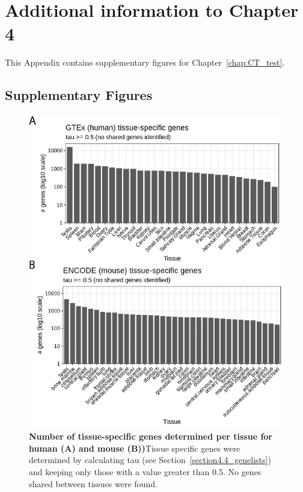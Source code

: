
\chapter{Additional information to Chapter 4} \label{appendix:CTsub}
This Appendix contains supplementary figures for Chapter~\ref{chap:CT_test}.


\section{Supplementary Figures}
\label{sectionC1.1}

\begin{figure}[pt!] 
\centering    
\includegraphics[width=1.0\textwidth]{Appendix3/Figs/appB_uniqueGenesTissue.png} %
\caption[Number of tissue-specific genes determined per tissue for mouse and human]{\textbf{Number of tissue-specific genes determined per tissue for human (A) and mouse (B))}\newline Tissue specific genes were determined by calculating tau (see Section~\ref{section4.4_genelists}) and keeping only those with a value greater than 0.5. No genes shared between tissues were found.}
\label{fig:appB_uniquegenes}
\end{figure}


